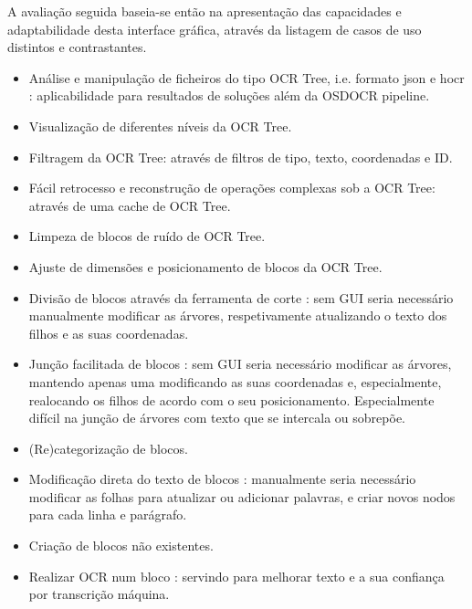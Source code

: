 A avaliação seguida baseia-se então na apresentação das capacidades e adaptabilidade desta interface gráfica, através da listagem de casos de uso distintos e contrastantes.


\begin{itemize}\setlength\itemsep{-0.5em}
	\item Análise e manipulação de ficheiros do tipo OCR Tree, i.e. formato json e hocr : aplicabilidade para resultados de soluções além da OSDOCR pipeline.
	
	\item Visualização de diferentes níveis da OCR Tree.
	
	\item Filtragem da OCR Tree: através de filtros de tipo, texto, coordenadas e ID.
	
	\item Fácil retrocesso e reconstrução de operações complexas sob a OCR Tree: através de uma cache de OCR Tree.
	
	\item Limpeza de blocos de ruído de OCR Tree.
	
	\item Ajuste de dimensões e posicionamento de blocos da OCR Tree.
	
	\item Divisão de blocos através da ferramenta de corte : sem GUI seria necessário manualmente modificar as árvores, respetivamente atualizando o texto dos filhos e as suas coordenadas.
	
	\item Junção facilitada de blocos : sem GUI seria necessário modificar as árvores, mantendo apenas uma modificando as suas coordenadas e, especialmente, realocando os filhos de acordo com o seu posicionamento. Especialmente difícil na junção de árvores com texto que se intercala ou sobrepõe.
	
	\item (Re)categorização de blocos.
	
	\item Modificação direta do texto de blocos : manualmente seria necessário modificar as folhas para atualizar ou adicionar palavras, e criar novos nodos para cada linha e parágrafo.
	
	\item Criação de blocos não existentes.
	
	\item Realizar OCR num bloco : servindo para melhorar texto e a sua confiança por transcrição máquina.
	

\end{itemize}
